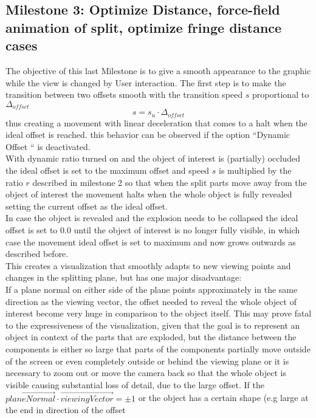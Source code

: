 \subsection{Milestone 3: Optimize Distance, force-field animation of split, optimize fringe distance cases} 
The objective of this last Milestone is to give a smooth appearance to the graphic while the view is changed by User interaction. The first step is to make the transition between two offsets smooth with the transition speed $s$ proportional to $\Delta_{offset}$
\begin{equation}
	s=s_u \cdot \Delta_{offset}
\end{equation}
thus creating a movement with linear deceleration that comes to a halt when the ideal offset is reached. this behavior can be observed if the option ``Dynamic Offset `` is deactivated.\\
With dynamic ratio turned on and the object of interest is (partially) occluded the ideal offset is set to the maximum  offset and speed $s$ is multiplied by the ratio $r$ described in milestone 2 so that when the split parts move away from the object of interest the movement halts when the whole object is fully revealed setting the current offset as the ideal offset.\\
In case the object is revealed and the explosion needs to be collapsed the ideal offset is set to 0.0 until the object of interest is no longer fully visible, in which case the movement ideal offset is set to maximum and now grows outwards as described before.\\
This creates a visualization that smoothly adapts to new viewing points and changes in the splitting plane, but has one major disadvantage:\\
If a plane normal on either side of the plane points approximately in the same direction as the viewing vector,  the offset needed to reveal the whole object of interest become very huge in comparison to the object itself. This may prove fatal to the expressiveness of the visualization, given that the goal is to represent an object in context of the parts that are exploded, but the distance between the components is either so large that parts of the components partially move outside of the screen or even completely outside or behind the viewing plane or it is necessary to zoom out or move the camera back so that the whole object is visible causing substantial loss of detail, due to the large offset. If the $\vec{planeNormal} \cdot \vec{viewingVector} = \pm1$ or the object has a certain shape (e.g large at the end in direction of the offset
